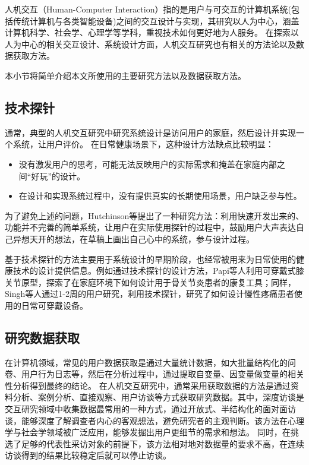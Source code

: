 人机交互（Human-Computer Interaction）指的是用户与可交互的计算机系统(包括传统计算机与各类智能设备)之间的交互设计与实现，其研究以人为中心，涵盖计算机科学、社会学、心理学等学科，重视技术如何更好地为人服务\cite{lazar2017research}。
在探索以人为中心的相关交互设计、系统设计方面，人机交互研究也有相关的方法论以及数据获取方法\cite{lazar2017research}。

本小节将简单介绍本文所使用的主要研究方法以及数据获取方法。


\subsection{技术探针}

通常，典型的人机交互研究中研究系统设计是访问用户的家庭，然后设计并实现一个系统，让用户评价。
在日常健康场景下，这种设计方法缺点比较明显\cite{Hutchinson2003Technology}：

\begin{itemize}
    \item 没有激发用户的思考，可能无法反映用户的实际需求和掩盖在家庭内部之间``好玩''的设计。
    \item 在设计和实现系统过程中，没有提供真实的长期使用场景，用户缺乏参与性。  
\end{itemize}


为了避免上述的问题，Hutchinson等\cite{Hutchinson2003Technology}提出了一种研究方法：利用快速开发出来的、功能并不完善的简单系统，让用户在实际使用探针的过程中，鼓励用户大声表达自己异想天开的想法，在草稿上画出自己心中的系统，参与设计过程。

基于技术探针的方法主要用于系统设计的早期阶段\cite{turmo2020training}，也经常被用来为日常使用的健康技术的设计提供信息。例如通过技术探针的设计方法，Papi等人\cite{papi2015knee}利用可穿戴式膝关节原型，探索了在家庭环境下如何设计用于骨关节炎患者的康复工具；同样，Singh等人\cite{singh2017supporting}通过1-2周的用户研究，利用技术探针，研究了如何设计慢性疼痛患者使用的日常可穿戴设备。

\subsection{研究数据获取}
在计算机领域，常见的用户数据获取是通过大量统计数据，如大批量结构化的问卷、用户行为日志等，然后在分析过程中，通过提取自变量、因变量做变量的相关性分析得到最终的结论。
在人机交互研究中，通常采用获取数据的方法是通过资料分析、案例分析、直接观察、用户访谈等方式获取研究数据。其中，深度访谈是交互研究领域中收集数据最常用的一种方式，通过开放式、半结构化的面对面访谈，能够深度了解调查者内心的客观想法，避免研究者的主观判断。该方法在心理学与社会学领域被广泛应用，能够发掘出用户更细节的需求和想法。
同时，在挑选了足够的代表性采访对象的前提下，该方法相对地对数据量的要求不高，在连续访谈得到的结果比较稳定后就可以停止访谈\cite{cleary2014data}。

